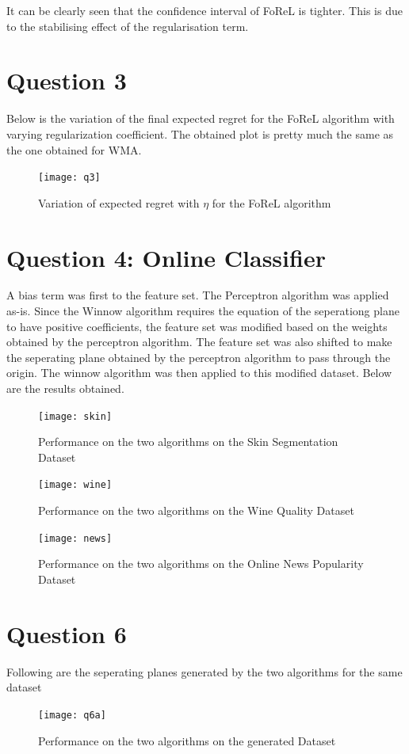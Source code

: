 \documentclass{article}
\begin{document}
It can be clearly seen that the confidence interval of FoReL is tighter. This is due to the stabilising effect of the regularisation term.

\newpage
\section*{Question 3}

Below is the variation of the final expected regret for the FoReL algorithm with varying regularization coefficient. The obtained plot is pretty much the same as the one obtained for WMA.
\begin{figure}[h!]
\centering
\texttt{[image: q3]}
\caption{Variation of expected regret with $\eta$ for the FoReL algorithm}
\end{figure}

\newpage
\section*{Question 4: Online Classifier}
A bias term was first to the feature set. The Perceptron algorithm was applied as-is. Since the Winnow algorithm requires the equation of the seperationg plane to have positive coefficients, the feature set was modified based on the weights obtained by the perceptron algorithm. The feature set was also shifted to make the seperating plane obtained by the perceptron algorithm to pass through the origin. The winnow algorithm was then applied to this modified dataset. Below are the results obtained.
\begin{figure}[h!]
\centering
\texttt{[image: skin]}
\caption{Performance on the two algorithms on the Skin Segmentation Dataset}
\end{figure}

\begin{figure}[h!]
\centering
\texttt{[image: wine]}
\caption{Performance on the two algorithms on the Wine Quality Dataset}
\end{figure}

\begin{figure}[t!]
\centering
\texttt{[image: news]}
\caption{Performance on the two algorithms on the Online News Popularity Dataset}
\end{figure}

\clearpage
\section*{Question 6}
Following are the seperating planes generated by the two algorithms for the same dataset
\begin{figure}[h!]
\centering
\texttt{[image: q6a]}
\caption{Performance on the two algorithms on the generated Dataset}
\end{figure}
\end{document}
